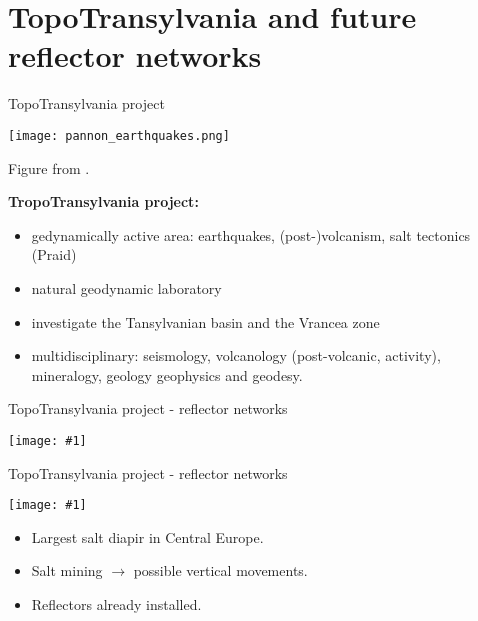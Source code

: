 \documentclass[aspectratio=169]{beamer}
\newcommand{\fig}[1]{
    \begin{mdframed}[linecolor=red!50!black, linewidth=2pt, roundcorner=2.25pt,
                     innerrightmargin=0pt, innerleftmargin=0pt,
                     innertopmargin=0pt, innerbottommargin=0pt,
                     backgroundcolor=white, frametitle={}, align=center]
        \texttt{[image: \#1]}
    \end{mdframed}
}
\begin{document}
\section{TopoTransylvania and future reflector networks}

\begin{frame}{TopoTransylvania project}
    \begin{minipage}[c]{0.54\textwidth}
        \texttt{[image: pannon\_earthquakes.png]}
        
        Figure from \cite{Matenco2018}.
    \end{minipage}
    \begin{minipage}[c]{0.45\textwidth}
        \pause
        \textbf{TropoTransylvania project:}
        \begin{itemize}
            \pause
            \item gedynamically active area: earthquakes, (post-)volcanism, salt tectonics (Praid)
            \pause
            \item natural geodynamic laboratory
            \pause
            \item investigate the Tansylvanian basin and the Vrancea zone
            \pause
            \item multidisciplinary: \pause seismology, \pause volcanology (post-volcanic, activity),
                  \pause mineralogy, \pause geology \pause geophysics \pause and geodesy.
        \end{itemize}
    \end{minipage}
\end{frame}

\begin{frame}{TopoTransylvania project - reflector networks}
    \begin{minipage}[c]{0.625\textwidth}
        \fig{praid_ciomadul.png}
    \end{minipage}
    \hspace{10pt}
    \begin{minipage}[c]{0.275\textwidth}
    \end{minipage}
\end{frame}

\begin{frame}{TopoTransylvania project - reflector networks}
    \begin{minipage}[c]{0.625\textwidth}
        \fig{parajd_3D_mod.png}
    \end{minipage}
    \hspace{10pt}
    \begin{minipage}[c]{0.275\textwidth}
        \begin{itemize}
            \pause
            \item Largest salt diapir in Central Europe.
            \pause
            \item Salt mining $\rightarrow$ possible vertical movements.
            \pause
            \item Reflectors already installed.
        \end{itemize}
    \end{minipage}
\end{frame}
\end{document}
